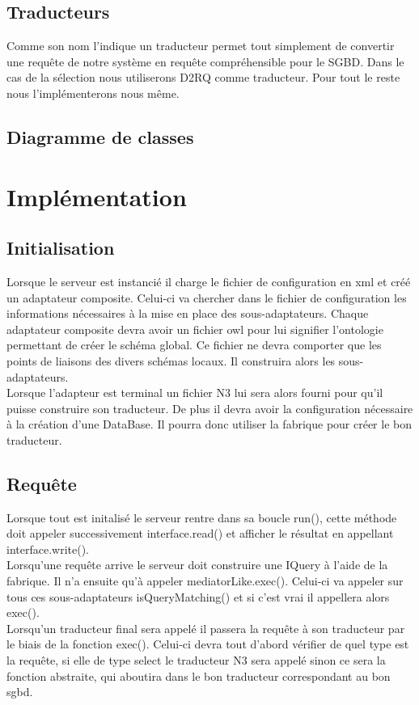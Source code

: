 \documentclass[12pt]{article}
\begin{document}
\subsection{Traducteurs}

	Comme son nom l'indique un traducteur permet tout simplement de convertir une requête de notre système en requête compréhensible pour le SGBD. Dans le cas de la sélection nous utiliserons D2RQ comme traducteur. Pour tout le reste nous l'implémenterons nous même.

\subsection{Diagramme de classes}

\section{Implémentation}

\subsection{Initialisation}

	Lorsque le serveur est instancié il charge le fichier de configuration en xml et créé un adaptateur composite. Celui-ci va chercher dans le fichier de configuration les informations nécessaires à la mise en place des sous-adaptateurs. Chaque adaptateur composite devra avoir un fichier owl pour lui signifier l'ontologie permettant de créer le schéma global. Ce fichier ne devra comporter que les points de liaisons des divers schémas locaux. Il construira alors les sous-adaptateurs. \\

\indent Lorsque l'adapteur est terminal un fichier N3 lui sera alors fourni pour qu'il puisse construire son traducteur. De plus il devra avoir la configuration nécessaire à la création d'une DataBase. Il pourra donc utiliser la fabrique pour créer le bon traducteur.

\subsection{Requête}

Lorsque tout est initalisé le serveur rentre dans sa boucle run(), cette méthode doit appeler successivement interface.read() et afficher le résultat en appellant interface.write(). \\

\indent Lorsqu'une requête arrive le serveur doit construire une IQuery à l'aide de la fabrique. Il n'a ensuite qu'à appeler mediatorLike.exec(). Celui-ci va appeler sur tous ces sous-adaptateurs isQueryMatching() et si c'est vrai il appellera alors exec(). \\
\indent Lorsqu'un traducteur final sera appelé il passera la requête à son traducteur par le biais de la fonction exec(). Celui-ci devra tout d'abord vérifier de quel type est la requête, si elle de type select le traducteur N3 sera appelé sinon ce sera la fonction abstraite, qui aboutira dans le bon traducteur correspondant au bon sgbd. \\
\end{document}
